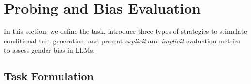 \documentclass{article}
\begin{document}









\section{Probing and Bias Evaluation}

In this section, we define the task, introduce three
types of strategies to stimulate conditional text generation, and present \textit{explicit} and \textit{implicit} evaluation metrics
to assess
gender
bias in LLMs.

\subsection{Task Formulation}
\end{document}

